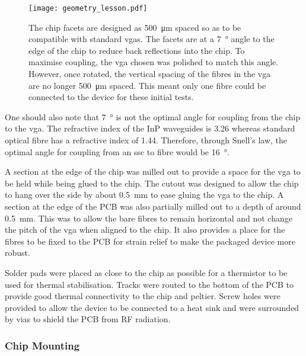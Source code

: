 
\begin{figure}[t]
	\centering
	\texttt{[image: geometry\_lesson.pdf]}
	\caption[A quick lesson in geometry for edge coupling]{The chip facets are designed as \SI{500}{\um} spaced so as to be compatible with standard \acsp{vga}. The facets are at a \SI{7}{\degree} angle to the edge of the chip to reduce back reflections into the chip. To maximise coupling, the \acs{vga} chosen was polished to match this angle. However, once rotated, the vertical spacing of the fibres in the \acs{vga} are no longer \SI{500}{\um} spaced. This meant only one fibre could be connected to the device for these initial tests.}
	\label{fig:geometry_lesson}
\end{figure}

One should also note that \SI{7}{\degree} is not the optimal angle for coupling from the chip to the \ac{vga}. The refractive index of the \ac{InP} waveguides is 3.26 whereas standard optical fibre has a refractive index of 1.44. Therefore, through Snell's law, the optimal angle for coupling from an \ac{ssc} to fibre would be \SI{16}{\degree}. 

A section at the edge of the chip was milled out to provide a space for the \ac{vga} to be held while being glued to the chip. The cutout was designed to allow the chip to hang over the side by about \SI{0.5}{\mm} to ease gluing the \ac{vga} to the chip. A section at the edge of the PCB was also partially milled out to a depth of around \SI{0.5}{\mm}. This was to allow the bare fibres to remain horizontal and not change the pitch of the \ac{vga} when aligned to the chip. It also provides a place for the fibres to be fixed to the PCB for strain relief to make the packaged device more robust.

Solder pads were placed as close to the chip as possible for a thermistor to be used for thermal stabilisation. Tracks were routed to the bottom of the PCB to provide good thermal connectivity to the chip and peltier. Screw holes were provided to allow the device to be connected to a heat sink and were surrounded by vias to shield the PCB from RF radiation.

\subsubsection*{Chip Mounting}

